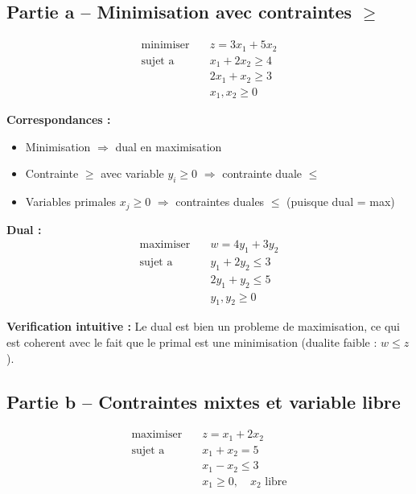 \documentclass[12pt,a4paper]{article}
\begin{document}
\subsection{Partie a -- Minimisation avec contraintes $\geq$}

\begin{enonce}
\begin{align*}
\text{minimiser} \quad & z = 3x_1 + 5x_2\\
\text{sujet a} \quad & x_1 + 2x_2 \geq 4\\
& 2x_1 + x_2 \geq 3\\
& x_1, x_2 \geq 0
\end{align*}
\end{enonce}

\begin{correction}
\textbf{Correspondances :}
\begin{itemize}
    \item Minimisation $\Rightarrow$ dual en maximisation
    \item Contrainte $\geq$ avec variable $y_i \geq 0$ $\Rightarrow$ contrainte duale $\leq$
    \item Variables primales $x_j \geq 0$ $\Rightarrow$ contraintes duales $\leq$ (puisque dual = max)
\end{itemize}

\textbf{Dual :}
\begin{align*}
\text{maximiser} \quad & w = 4y_1 + 3y_2\\
\text{sujet a} \quad & y_1 + 2y_2 \leq 3\\
& 2y_1 + y_2 \leq 5\\
& y_1, y_2 \geq 0
\end{align*}

\textbf{Verification intuitive :} Le dual est bien un probleme de maximisation, ce qui est coherent avec le fait que le primal est une minimisation (dualite faible : $w \leq z$).
\end{correction}

\subsection{Partie b -- Contraintes mixtes et variable libre}

\begin{enonce}
\begin{align*}
\text{maximiser} \quad & z = x_1 + 2x_2\\
\text{sujet a} \quad & x_1 + x_2 = 5\\
& x_1 - x_2 \leq 3\\
& x_1 \geq 0, \quad x_2 \text{ libre}
\end{align*}
\end{enonce}
\end{document}
